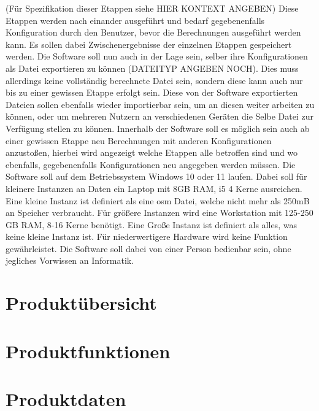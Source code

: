 \documentclass[parskip=full]{scrartcl} %
\begin{document}
(Für Spezifikation dieser Etappen siehe HIER KONTEXT ANGEBEN)
\newline
Diese Etappen werden nach einander ausgeführt und bedarf gegebenenfalls Konfiguration durch den Benutzer, bevor die Berechnungen ausgeführt werden kann.
Es sollen dabei Zwischenergebnisse der einzelnen Etappen gespeichert werden.
Die Software soll nun auch in der Lage sein, selber ihre Konfigurationen als Datei exportieren zu können (DATEITYP ANGEBEN NOCH). Dies muss allerdings keine vollständig berechnete Datei sein, sondern diese kann auch nur bis zu einer gewissen Etappe erfolgt sein.
Diese von der Software exportierten Dateien sollen ebenfalls wieder importierbar sein, um an diesen weiter arbeiten zu können, oder um mehreren Nutzern an verschiedenen Geräten die Selbe Datei zur Verfügung stellen zu können.
Innerhalb der Software soll es möglich sein auch ab einer gewissen Etappe neu Berechnungen mit anderen Konfigurationen anzustoßen, hierbei wird angezeigt welche Etappen alle betroffen sind und wo ebenfalls, gegebenenfalls Konfigurationen neu angegeben werden müssen.
Die Software soll auf dem Betriebssystem Windows 10 oder 11 laufen.
Dabei soll für kleinere Instanzen an Daten ein Laptop mit 8GB RAM, i5 4 Kerne ausreichen.
Eine kleine Instanz ist definiert als eine osm Datei, welche nicht mehr als 250mB an Speicher verbraucht.
Für größere Instanzen wird eine Workstation mit 125-250 GB RAM, 8-16 Kerne benötigt.
Eine Große Instanz ist definiert als alles, was keine kleine Instanz ist.
Für niederwertigere Hardware wird keine Funktion gewährleistet.
Die Software soll dabei von einer Person bedienbar sein, ohne jegliches Vorwissen an Informatik.

\newpage



\section{Produktübersicht}
\newpage



\section{Produktfunktionen}
\newpage



\section{Produktdaten}
\newpage
\end{document}

